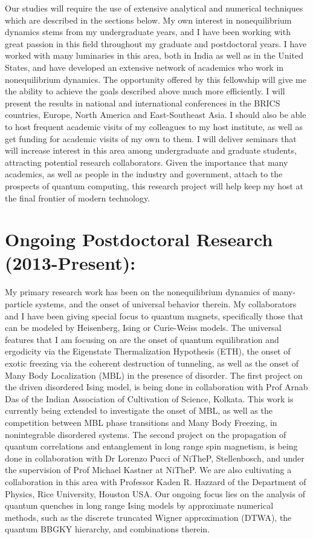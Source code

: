 \documentclass[a4paper,9pt]{article}
\begin{document}
Our studies will require the use of extensive analytical and numerical techniques which are described in the sections below. My own interest in nonequilibrium dynamics stems from my undergraduate years, and I have been working with great passion in this field throughout my graduate and postdoctoral years. I have worked with many luminaries in this area, both in India as well as in the United States, and have developed an extensive network of academics who work in nonequilibrium dynamics. The opportunity offered by this fellowship will give me the ability to achieve the goals described above much more efficiently. I will present the results in national and international conferences in the BRICS countries, Europe, North America and East-Southeast Asia. I should also be able to host frequent academic visits of my colleagues to my host institute, as well as get funding for academic visits of my own to them. I will deliver seminars that will increase interest in this area among undergraduate and graduate students, attracting potential research collaborators.  Given the importance that many academics, as well as people in the industry and government, attach to the prospects of quantum computing, this research project will help keep my host at the final frontier of modern technology.

\section{Ongoing Postdoctoral Research (2013-Present):}

My primary research work has been on the nonequilibrium dynamics of many-particle systems, and the onset of universal behavior therein.
My collaborators and I have been giving special focus to quantum magnets, specifically those that can be modeled by Heisenberg, Ising or Curie-Weiss models. The universal features that I am focusing on are the onset of quantum equilibration and ergodicity via the Eigenstate Thermalization  Hypothesis (ETH), the onset of exotic freezing via the coherent destruction of tunneling, as well as the onset of Many Body Localization (MBL) in the presence of disorder. The first project on the driven disordered Ising model, is being done in collaboration with Prof Arnab Das of the Indian Association of Cultivation of Science, Kolkata. This work is currently being extended to investigate the onset of MBL, as well as the competition between MBL phase transitions and Many Body Freezing, in nonintegrable disordered systems. The second project on the propagation of quantum correlations and entanglement in long range spin magnetism, is being done in collaboration with Dr Lorenzo Pucci of NiTheP, Stellenbosch, and  under the supervision of Prof Michael Kastner at NiTheP. We are also cultivating a collaboration in this area with Professor Kaden R. Hazzard of the Department of Physics, Rice University, Houston USA. Our ongoing focus lies on  the analysis of quantum quenches in long range Ising models by approximate numerical methods, such as the discrete truncated Wigner approximation (DTWA), the quantum BBGKY hierarchy, and combinations therein.
\end{document}
